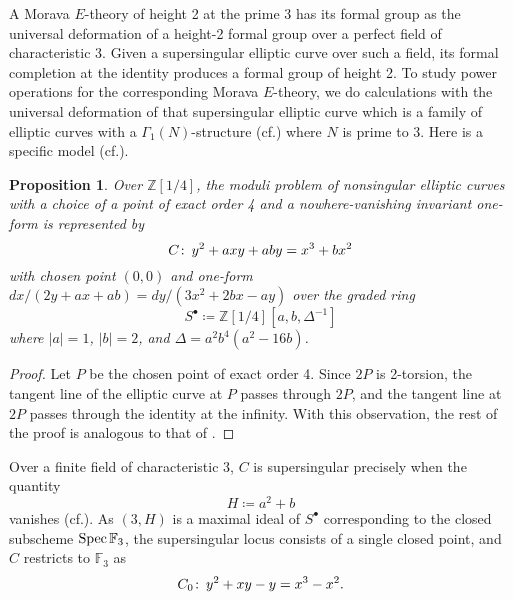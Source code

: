 \documentclass{gtpart}
\newtheorem{prop}[thm]{Proposition}
\theoremstyle{definition}
\theoremstyle{remark}
\def\co{\colon\thinspace}
\newcommand{\mb}[1]{\mathbb{#1}}
\newcommand{\Spec}{{\rm Spec\thinspace}}
\newcommand{\cf}{cf.\thinspace}
\newcommand{\BF}{{\mb F}}
\newcommand{\BZ}{{\mb Z}}
\newcommand{\G}{\Gamma}
\newcommand{\s}{S^\bullet}
\begin{document}
A Morava $E$-theory of height 2 at the prime 3 has its formal group as 
the universal deformation of a height-2 formal group over a perfect field of characteristic 3.  
Given a supersingular elliptic curve over such a field, 
its formal completion at the identity produces a formal group of height 2.  
To study power operations for the corresponding Morava $E$-theory, 
we do calculations with the universal deformation of that supersingular elliptic curve 
which is a family of elliptic curves with a $\G_1(N)$-structure (\cf \cite[Section 3.2]{KM}) where $N$ is prime to 3.  
Here is a specific model (\cf \cite[4(4.6a)]{ec}).  

\begin{prop}
\label{prop:C}
 Over $\BZ [1/4]$, the moduli problem of nonsingular elliptic curves with a choice of 
 a point of exact order 4 and a nowhere-vanishing invariant one-form is represented by 
 \begin{equation}
 \label{Cxy}
  C \co y^2 + a x y + a b y = x^3 + b x^2 
 \end{equation}
 with chosen point $(0,0)$ and one-form $dx / (2 y + a x + a b) = dy / (3 x^2 + 2 b x - a y)$ 
 over the graded ring 
 \[
  \s \coloneqq \BZ [1/4] [a, b, \Delta^{-1}] 
 \]
 where $|a| = 1$, $|b| = 2$, and $\Delta = a^2 b^4 (a^2 - 16 b)$.  
\end{prop}
\begin{proof}
 Let $P$ be the chosen point of exact order 4.  
 Since $2P$ is 2-torsion, the tangent line of the elliptic curve at $P$ passes through $2P$, 
 and the tangent line at $2P$ passes through the identity at the infinity.  
 With this observation, the rest of the proof is analogous to that of \cite[Proposition 3.2]{tmf3}.  
\end{proof}

Over a finite field of characteristic 3, $C$ is supersingular precisely when the quantity 
\begin{equation}
\label{H}
 H \coloneqq a^2 + b 
\end{equation}
vanishes (\cf \cite[V.4.1a]{AEC}).  
As $(3,H)$ is a maximal ideal of $\s$ corresponding to the closed subscheme $\Spec \BF_3$, 
the supersingular locus consists of a single closed point, 
and $C$ restricts to $\BF_3$ as 
\[
 C_0 \co y^2 + x y - y = x^3 - x^2.  
\]
\end{document}
